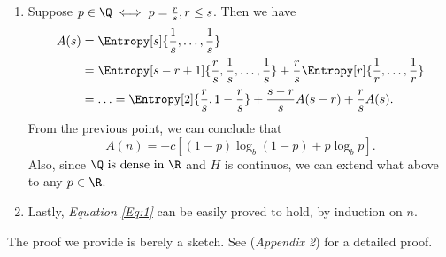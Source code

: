 \documentclass{subfiles}
\begin{document}
\begin{proof*}
\begin{enumerate}
            \item Suppose \(p \in \Q \iff p = \tfrac{r}{s}, r \le s\).
                Then we have 
                \[\begin{aligned}
                    A(s) & = \Entropy[s]{\frac{1}{s}, \ldots, \frac{1}{s}} \\ 
                        & = \Entropy[s - r + 1]{\frac{r}{s}, \frac{1}{s}, \ldots, \frac{1}{s}} 
                          + \frac{r}{s} \Entropy[r]{\frac{1}{r}, \ldots, \frac{1}{r}} \\ 
                        & = \ldots = \Entropy[2]{\frac{r}{s}, 1 - \frac{r}{s}}
                          + \frac{s - r}{s} A(s - r) + \frac{r}{s} A(s).
                \end{aligned}\]
                From the previous point, we can conclude that 
                \[
                    A(n) = -c \left\lbrack
                        (1 - p) \log_{b} (1 - p) + p \log_{b} p
                    \right\rbrack.
                \]
                Also, since \(\Q \text{ is dense in } \R\) and \(H\) is continuos,
                we can extend what above to any \(p \in \R\).

            \item Lastly, \emph{Equation \eqref{Eq:1}} can be easily proved to hold,
                by induction on \(n\).

        \end{enumerate}
    \end{proof*}
    The proof we provide is berely a sketch.
    See \cite{ShannonEntropy} (\emph{Appendix 2}) for a detailed proof.
\end{document}
